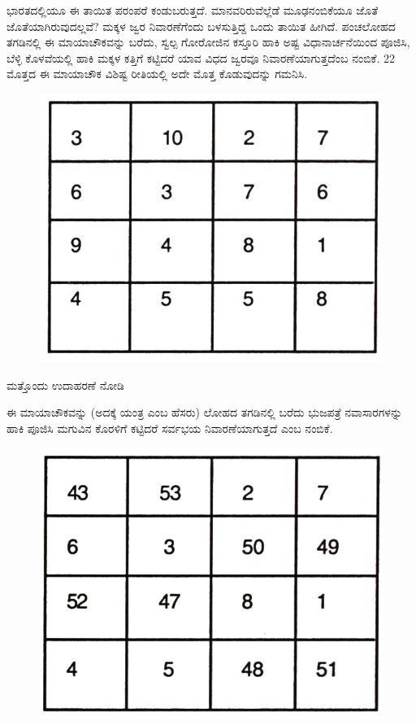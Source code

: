 ಭಾರತದಲ್ಲಿಯೂ ಈ ತಾಯಿತ ಪರಂಪರೆ ಕಂಡುಬರುತ್ತದೆ. ಮಾನವರಿರುವೆಲ್ಲೆಡೆ \linebreak ಮೂಢನಂಬಿಕೆಯೂ ಜೊತೆ ಜೊತೆಯಾಗಿರುವುದಲ್ಲವೆ? ಮಕ್ಕಳ ಜ್ವರ ನಿವಾರಣೆಗೆಂದು ಬಳಸುತ್ತಿದ್ದ ಒಂದು ತಾಯಿತ ಹೀಗಿದೆ. ಪಂಚಲೋಹದ ತಗಡಿನಲ್ಲಿ ಈ ಮಾಯಾಚೌಕವನ್ನು ಬರೆದು, ಸ್ವಲ್ಪ ಗೋರೋಜಿನ ಕಸ್ತೂರಿ ಹಾಕಿ ಅಷ್ಟ ವಿಧಾನಾರ್ಚನೆಯಿಂದ ಪೂಜಿಸಿ, ಬೆಳ್ಳಿ ಕೊಳವೆಯಲ್ಲಿ ಹಾಕಿ ಮಕ್ಕಳ ಕತ್ತಿಗೆ ಕಟ್ಟಿದರೆ ಯಾವ ವಿಧದ ಜ್ವರವೂ ನಿವಾರಣೆಯಾಗುತ್ತದೆಂಬ ನಂಬಿಕೆ. 22 ಮೊತ್ತದ ಈ ಮಾಯಾಚೌಕ ವಿಶಿಷ್ಟ ರೀತಿಯಲ್ಲಿ ಅದೇ ಮೊತ್ತ ಕೊಡುವುದನ್ನು ಗಮನಿಸಿ.
\begin{figure}[H]
\includegraphics{src/figures/chap11/fig11-3.jpg}
\end{figure}

ಮತ್ತೊಂದು ಉದಾಹರಣೆ ನೋಡಿ

ಈ ಮಾಯಾಚೌಕವನ್ನು (ಅದಕ್ಕೆ ಯಂತ್ರ ಎಂಬ ಹೆಸರು) ಲೋಹದ ತಗಡಿನಲ್ಲಿ \hbox{ಬರೆದು} ಭುಜಪತ್ರೆ ನವಾಸಾರಗಳನ್ನು ಹಾಕಿ ಪೂಜಿಸಿ ಮಗುವಿನ ಕೊರಳಿಗೆ ಕಟ್ಟಿದರೆ ಸರ್ವಭಯ \linebreak ನಿವಾರಣೆಯಾಗುತ್ತದೆ ಎಂಬ ನಂಬಿಕೆ.
\begin{figure}[H]
\includegraphics{src/figures/chap11/fig11-4.jpg}
\end{figure}

